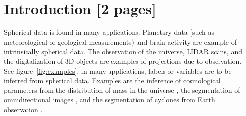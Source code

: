\documentclass{article} %
\renewcommand{\figref}[1]{figure~\ref{fig:#1}}
\begin{document}
\section{Introduction [2 pages]}

Spherical data is found in many applications.
Planetary data (such as meteorological or geological measurements) and brain activity are example of intrinsically spherical data.
The observation of the universe, LIDAR scans, and the digitalization of 3D objects are examples of projections due to observation.
See \figref{examples}.
In many applications, labels or variables are to be inferred from spherical data.
Examples are the inference of cosmological parameters from the distribution of mass in the universe \citep{perraudin2019deepspherecosmo}, the segmentation of omnidirectional images \citep{khasanova2017sphericalcnn}, and the segmentation of cyclones from Earth observation \citep{mudigonda2017climateevents}.
\end{document}
